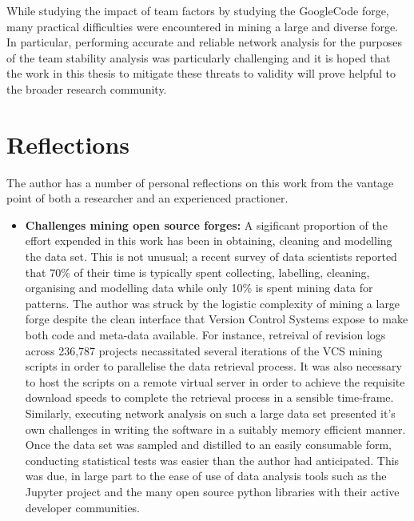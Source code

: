 While studying the impact of team factors by studying the GoogleCode forge, many practical difficulties were encountered in mining a large and diverse forge. In particular, performing accurate and reliable network analysis for the purposes of the team stability analysis was particularly challenging and it is hoped that the work in this thesis to mitigate these threats to validity will prove helpful to the broader research community. 

\section{Reflections} %
The author has a number of personal reflections on this work from the vantage point of both a researcher and an experienced practioner.

\begin{itemize}
\item  \textbf{Challenges mining open source forges: } A sigificant proportion of the effort expended in this work has been in obtaining, cleaning and modelling the data set. This is not unusual; a recent survey of data scientists reported that 70\% of their time is typically spent collecting, labelling, cleaning, organising and modelling data while only 10\% is spent mining data for patterns. The author was struck by the logistic complexity of mining a large forge despite the clean interface that Version Control Systems expose to make both code and meta-data available. For instance, retreival of revision logs across 236,787 projects necassitated several iterations of the VCS mining scripts in order to parallelise the data retrieval process. It was also necessary to  host the scripts on a remote virtual server in order to achieve the requisite download speeds to complete the retrieval process in a sensible time-frame. Similarly, executing network analysis on such a large data set presented it's own challenges in writing the software in a suitably memory efficient manner. Once the data set was sampled and distilled to an easily consumable form, conducting statistical tests was easier than the author had anticipated. This was due, in large part to the ease of use of data analysis tools such as the Jupyter project and the many open source python libraries with their active developer communities.


\end{itemize}
